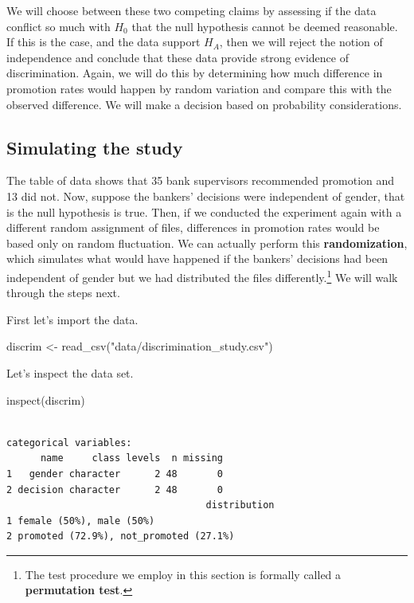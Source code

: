 \documentclass[
  letterpaper,
  DIV=11,
  numbers=noendperiod]{scrreprt}
\newenvironment{Shaded}{\begin{snugshade}}{\end{snugshade}}
\newcommand{\FunctionTok}[1]{\textcolor[rgb]{0.28,0.35,0.67}{#1}}
\newcommand{\NormalTok}[1]{\textcolor[rgb]{0.00,0.23,0.31}{#1}}
\newcommand{\OtherTok}[1]{\textcolor[rgb]{0.00,0.23,0.31}{#1}}
\newcommand{\StringTok}[1]{\textcolor[rgb]{0.13,0.47,0.30}{#1}}
\begin{document}
We will choose between these two competing claims by assessing if the
data conflict so much with \(H_0\) that the null hypothesis cannot be
deemed reasonable. If this is the case, and the data support \(H_A\),
then we will reject the notion of independence and conclude that these
data provide strong evidence of discrimination. Again, we will do this
by determining how much difference in promotion rates would happen by
random variation and compare this with the observed difference. We will
make a decision based on probability considerations.

\subsection{Simulating the study}\label{simulating-the-study}

The table of data shows that 35 bank supervisors recommended promotion
and 13 did not. Now, suppose the bankers' decisions were independent of
gender, that is the null hypothesis is true. Then, if we conducted the
experiment again with a different random assignment of files,
differences in promotion rates would be based only on random
fluctuation. We can actually perform this \textbf{randomization}, which
simulates what would have happened if the bankers' decisions had been
independent of gender but we had distributed the files
differently.\footnote{The test procedure we employ in this section is
  formally called a \textbf{permutation test}.} We will walk through the
steps next.

First let's import the data.

\begin{Shaded}
\begin{Highlighting}[]
\NormalTok{discrim }\OtherTok{\textless{}{-}} \FunctionTok{read\_csv}\NormalTok{(}\StringTok{"data/discrimination\_study.csv"}\NormalTok{)}
\end{Highlighting}
\end{Shaded}

Let's inspect the data set.

\begin{Shaded}
\begin{Highlighting}[]
\FunctionTok{inspect}\NormalTok{(discrim)}
\end{Highlighting}
\end{Shaded}

\begin{verbatim}

categorical variables:  
      name     class levels  n missing
1   gender character      2 48       0
2 decision character      2 48       0
                                   distribution
1 female (50%), male (50%)                     
2 promoted (72.9%), not_promoted (27.1%)       
\end{verbatim}
\end{document}

